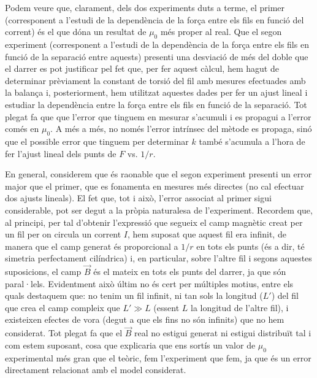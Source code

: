 \documentclass[a4paper,10.5pt]{report}
\begin{document}
Podem veure que, clarament, dels dos experiments duts a terme, el primer (corresponent a l'estudi de la dependència de la força entre els fils en funció del corrent) és el que dóna un resultat de $\mu_0$ més proper al real. Que el segon experiment (corresponent a l'estudi de la dependència de la força entre els fils en funció de la separació entre aquests) presenti una desviació de més del doble que el darrer es pot justificar pel fet que, per fer aquest càlcul, hem hagut de determinar prèviament la constant de torsió del fil amb mesures efectuades amb la balança i, posteriorment, hem utilitzat aquestes dades per fer un ajust lineal i estudiar la dependència entre la força entre els fils en funció de la separació. Tot plegat fa que que l'error que tinguem en mesurar s'acumuli i es propagui a l'error comés en $\mu_0$. A més a més, no només l'error intrínsec del mètode es propaga, sinó que el possible error que tinguem per determinar $k$ també s'acumula a l'hora de fer l'ajust lineal dels punts de $F$ vs. $1/r$.

En general, considerem que és raonable que el segon experiment presenti un error major que el primer, que es fonamenta en mesures més directes (no cal efectuar dos ajusts lineals). El fet que, tot i això, l'error associat al primer sigui considerable, pot ser degut a la pròpia naturalesa de l'experiment. Recordem  que, al principi, per tal d'obtenir l'expressió que segueix el camp magnètic creat per un fil per on circula un corrent $I$, hem suposat que aquest fil era infinit, de manera que el camp generat és proporcional a $1/r$ en tots els punts (és a dir, té simetria perfectament cilíndrica) i, en particular, sobre l'altre fil i segons aquestes suposicions, el camp $\vec{B}$ és el mateix en tots els punts del darrer, ja que són paral·lels. Evidentment això últim no és cert per múltiples motius, entre els quals destaquem que: no tenim un fil infinit, ni tan sols la longitud ($L'$) del fil que crea el camp compleix que $L'\gg L$ (essent $L$ la longitud de l'altre fil), i existeixen efectes de vora (degut a que els fins no són infinits) que no hem considerat. Tot plegat fa que el $\vec{B}$ real no estigui generat ni estigui distribuït tal i com estem suposant, cosa que explicaria que ens sortís un valor de $\mu_0$ experimental més gran que el teòric, fem l'experiment que fem, ja que és un error directament relacionat amb el model considerat.
\end{document}
